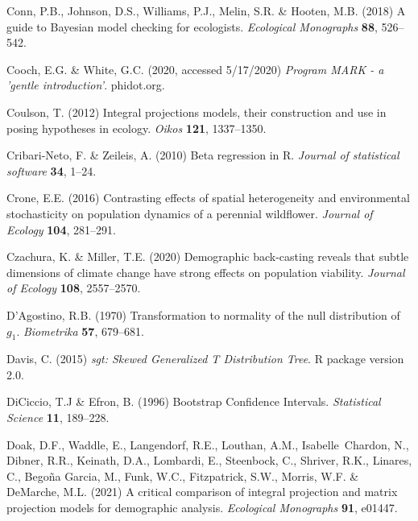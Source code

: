 \documentclass[12pt]{article}
\begin{document}
\begin{spacing}{1.9}
\begin{thebibliography}{62}
Conn, P.B., Johnson, D.S., Williams, P.J., Melin, S.R. \& Hooten, M.B. (2018) A
  guide to {B}ayesian model checking for ecologists. \emph{Ecological
  Monographs} \textbf{88}, 526--542.

Cooch, E.G. \& White, G.C. (2020, accessed 5/17/2020) \emph{Program MARK - a
  'gentle introduction'}. phidot.org.

Coulson, T. (2012) {I}ntegral projections models, their construction and use in
  posing hypotheses in ecology. \emph{Oikos} \textbf{121}, 1337--1350.

Cribari-Neto, F. \& Zeileis, A. (2010) Beta regression in {R}. \emph{Journal of
  statistical software} \textbf{34}, 1--24.

Crone, E.E. (2016) Contrasting effects of spatial heterogeneity and
  environmental stochasticity on population dynamics of a perennial wildflower.
  \emph{Journal of Ecology} \textbf{104}, 281--291.

Czachura, K. \& Miller, T.E. (2020) Demographic back-casting reveals that
  subtle dimensions of climate change have strong effects on population
  viability. \emph{Journal of Ecology} \textbf{108}, 2557--2570.

D'Agostino, R.B. (1970) Transformation to normality of the null distribution of
 $g_1$. \emph{Biometrika} \textbf{57}, 679--681.

Davis, C. (2015) \emph{sgt: Skewed Generalized T Distribution Tree}. R package
  version 2.0.
  
DiCiccio, T.J \& Efron, B. (1996) Bootstrap Confidence Intervals. 
\emph{Statistical Science} \textbf{11}, 189--228.
  
   

Doak, D.F., Waddle, E., Langendorf, R.E., Louthan, A.M., Isabelle~Chardon, N.,
  Dibner, R.R., Keinath, D.A., Lombardi, E., Steenbock, C., Shriver, R.K.,
  Linares, C., Bego\~{n}a Garcia, M., Funk, W.C., Fitzpatrick, S.W., Morris,
  W.F. \& DeMarche, M.L. (2021) A critical comparison of integral projection
  and matrix projection models for demographic analysis. \emph{Ecological
  Monographs} \textbf{91}, e01447.


\end{thebibliography}
\end{spacing}
\end{document}
